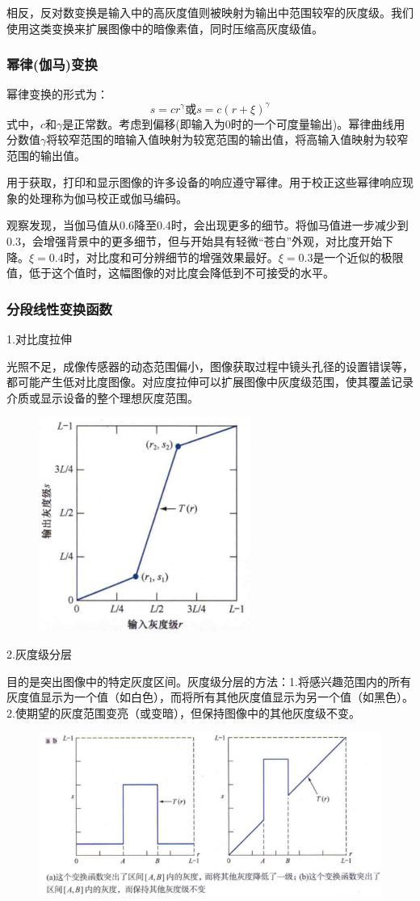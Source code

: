 \documentclass[11pt]{article}
\begin{document}
相反，反对数变换是输入中的高灰度值则被映射为输出中范围较窄的灰度级。我们使用这类变换来扩展图像中的暗像素值，同时压缩高灰度级值。
\subsubsection{幂律(伽马)变换}
幂律变换的形式为：
$$s=cr^\gamma \text{或} s=c(r+\xi)^\gamma$$
式中，$c$和$\gamma$是正常数。考虑到偏移(即输入为0时的一个可度量输出)。幂律曲线用分数值$\gamma$将较窄范围的暗输入值映射为较宽范围的输出值，将高输入值映射为较窄范围的输出值。

用于获取，打印和显示图像的许多设备的响应遵守幂律。用于校正这些幂律响应现象的处理称为伽马校正或伽马编码。

观察发现，当伽马值从0.6降至0.4时，会出现更多的细节。将伽马值进一步减少到0.3，会增强背景中的更多细节，但与开始具有轻微“苍白”外观，对比度开始下降。$\xi = 0.4$时，对比度和可分辨细节的增强效果最好。$\xi =0.3$是一个近似的极限值，低于这个值时，这幅图像的对比度会降低到不可接受的水平。
\subsubsection{分段线性变换函数}
1.对比度拉伸

光照不足，成像传感器的动态范围偏小，图像获取过程中镜头孔径的设置错误等，都可能产生低对比度图像。对应度拉伸可以扩展图像中灰度级范围，使其覆盖记录介质或显示设备的整个理想灰度范围。
\begin{figure}[H]
	\centering
	\includegraphics[scale=0.6]{61}
\end{figure}
2.灰度级分层

目的是突出图像中的特定灰度区间。灰度级分层的方法：1.将感兴趣范围内的所有灰度值显示为一个值（如白色），而将所有其他灰度值显示为另一个值（如黑色）。2.使期望的灰度范围变亮（或变暗），但保持图像中的其他灰度级不变。
\begin{figure}[H]
	\centering
	\includegraphics[scale=0.6]{62}
\end{figure}
\end{document}
